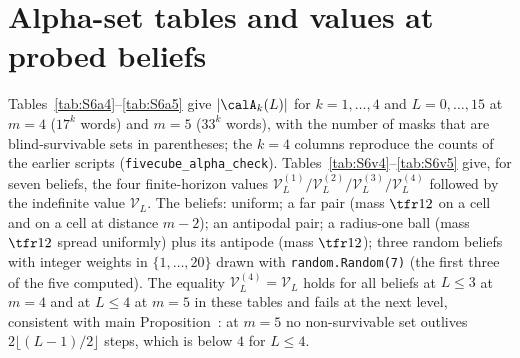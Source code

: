 \section{Alpha-set tables and values at probed beliefs}\label{S:alpha}

Tables~\ref{tab:S6a4}--\ref{tab:S6a5} give $|\calA_k(L)|$ for $k=1,\dots,4$ and $L=0,\dots,15$ at $m=4$ ($17^k$ words) and $m=5$ ($33^k$ words), with the number of masks that are blind-survivable sets in parentheses; the $k=4$ columns reproduce the counts of the earlier scripts (\texttt{fivecube\_alpha\_check}). Tables~\ref{tab:S6v4}--\ref{tab:S6v5} give, for seven beliefs, the four finite-horizon values $\mathcal V^{(1)}_L/\mathcal V^{(2)}_L/\mathcal V^{(3)}_L/\mathcal V^{(4)}_L$ followed by the indefinite value $\mathcal V_L$. The beliefs: uniform; a far pair (mass $\tfr12$ on a cell and on a cell at distance $m-2$); an antipodal pair; a radius-one ball (mass $\tfr12$ spread uniformly) plus its antipode (mass $\tfr12$); three random beliefs with integer weights in $\{1,\dots,20\}$ drawn with \texttt{random.Random(7)} (the first three of the five computed). The equality $\mathcal V^{(4)}_L=\mathcal V_L$ holds for all beliefs at $L\le3$ at $m=4$ and at $L\le4$ at $m=5$ in these tables and fails at the next level, consistent with main Proposition~: at $m=5$ no non-survivable set outlives $2\lfloor(L-1)/2\rfloor$ steps, which is below $4$ for $L\le4$.
\begin{table}[H]\centering\small
\caption{$|\calA_k(L)|$ (survivable masks) at $m=4$.}\label{tab:S6a4}

\end{table}
\begin{table}[H]\centering\small
\caption{$|\calA_k(L)|$ (survivable masks) at $m=5$.}\label{tab:S6a5}

\end{table}
\begin{table}[H]\centering\tiny
\caption{Values at probed beliefs, $m=4$: $\mathcal V^{(1)}/\mathcal V^{(2)}/\mathcal V^{(3)}/\mathcal V^{(4)}\mid\mathcal V_L$.}\label{tab:S6v4}

\end{table}
\begin{table}[H]\centering\tiny
\caption{Values at probed beliefs, $m=5$.}\label{tab:S6v5}

\end{table}
